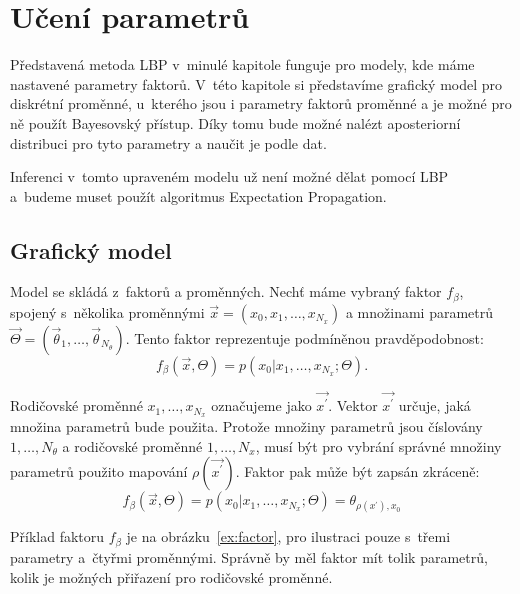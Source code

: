 \chapter{Učení parametrů}
\label{ch:ep}

Představená metoda LBP v~minulé kapitole funguje pro modely, kde máme nastavené parametry faktorů.
V~této kapitole si představíme grafický model pro diskrétní proměnné, u~kterého jsou i parametry faktorů proměnné a je možné pro ně použít Bayesovský přístup.
Díky tomu bude možné nalézt aposteriorní distribuci pro tyto parametry a naučit je podle dat.

Inferenci v~tomto upraveném modelu už není možné dělat pomocí LBP a~budeme muset použít algoritmus Expectation Propagation.

\section{Grafický model}

Model se skládá z~faktorů a proměnných.
Nechť máme vybraný faktor $f_\beta$, spojený s~několika proměnnými
$\vec{x} = (x_0, x_1, \dots, x_{N_x})$
a množinami parametrů
$\vec{\Theta} = (\vec{\theta}_1, \dots, \vec{\theta}_{N_\theta})$.
Tento faktor reprezentuje podmíněnou pravděpodobnost:
$$f_\beta(\vec{x}, \Theta) = p(x_0 | x_1, \dots, x_{N_x}; \Theta).$$

Rodičovské proměnné $x_1, \dots, x_{N_x}$ označujeme jako $\vec{x^\prime}$.
Vektor $\vec{x^\prime}$ určuje, jaká množina parametrů bude použita.
Protože množiny parametrů jsou číslovány $1, \dots, N_\theta$ a rodičovské
proměnné $1, \dots, N_x$, musí být pro vybrání správné množiny parametrů
použito mapování $\rho(\vec{x^\prime})$.
Faktor pak může být zapsán zkráceně:
$$f_\beta(\vec{x}, \Theta) = p(x_0 | x_1, \dots, x_{N_x}; \Theta) =
\theta_{\rho(x^\prime), x_0}$$

Příklad faktoru $f_\beta$ je na obrázku~\ref{ex:factor}, pro ilustraci pouze s~třemi parametry a~čtyřmi proměnnými.
Správně by měl faktor mít tolik parametrů, kolik je možných přiřazení pro rodičovské proměnné.


